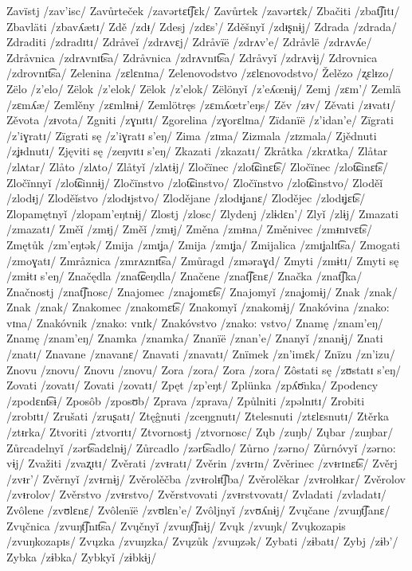 Zavïstj /zav’isc/
Zavůrteček /zavərtɛt͡ʃɛk/
Zavůrtek /zavərtɛk/
Zbačiti /zbat͡ʃɪtɪ/
Zbavläti /zbavʎætɪ/
Zdě /zdᵻ/
Zdesj /zdɛs’/
Zděšnyǐ /zdᵻʂnɨj/
Zdrada /zdrada/
Zdraditi /zdradɪtɪ/
Zdråveǐ /zdrʌvɛj/
Zdråvïë /zdrʌv’e/
Zdråvlë /zdrʌvʎe/
Zdråvnica /zdrʌvnɪt͡sa/
Zdråvnica /zdrʌvnɪt͡sa/
Zdråvyǐ /zdrʌvɨj/
Zdrovnica /zdrovnɪt͡sa/
Zelenina /zɛlɛnɪna/
Zelenovodstvo /zɛlɛnovodstvo/
Želězo /ʐɛlᵻzo/
Zëlo /z’elo/
Zëlok /z’elok/
Zëlok /z’elok/
Zëlönyǐ /z’eʎœnɨj/
Zemj /zɛm’/
Zemlä /zɛmʎæ/
Zemlěny /zɛmlᵻnɨ/
Zemlötręs /zɛmʎœtr’eŋs/
Zěv /zᵻv/
Zěvati /zᵻvatɪ/
Zěvota /zᵻvota/
Zgniti /zɣnɪtɪ/
Zgorelina /zɣorɛlɪna/
Zïdanïë /z’idan’e/
Zïgrati /z’iɣratɪ/
Zïgrati sę /z’iɣratɪ s’eŋ/
Zima /zɪma/
Zizmala /zɪzmala/
Zjědnuti /zʝᵻdnutɪ/
Zjęviti sę /zeŋvɪtɪ s’eŋ/
Zkazati /zkazatɪ/
Zkråtka /zkrʌtka/
Zlåtar /zlʌtar/
Zlåto /zlʌto/
Zlåtyǐ /zlʌtɨj/
Zločïnec /zlot͡ɕinɛt͡s/
Zločïnec /zlot͡ɕinɛt͡s/
Zločïnnyǐ /zlot͡ɕinnɨj/
Zločïnstvo /zlot͡ɕinstvo/
Zločïnstvo /zlot͡ɕinstvo/
Zloděǐ /zlodᵻj/
Zloděǐstvo /zlodᵻjstvo/
Zlodějane /zlodᵻʝanɛ/
Zlodějec /zlodᵻʝɛt͡s/
Zlopamętnyǐ /zlopam’eŋtnɨj/
Zlostj /zlosc/
Zlydenj /zlɨdɛn’/
Zlyǐ /zlɨj/
Zmazati /zmazatɪ/
Změǐ /zmᵻj/
Změǐ /zmᵻj/
Změna /zmᵻna/
Změnivec /zmᵻnɪvɛt͡s/
Zmętůk /zm’eŋtək/
Zmija /zmɪʝa/
Zmija /zmɪʝa/
Zmijalica /zmɪʝalɪt͡sa/
Zmogati /zmoɣatɪ/
Zmråznica /zmrʌznɪt͡sa/
Zmůragd /zməraɣd/
Zmyti /zmɨtɪ/
Zmyti sę /zmɨtɪ s’eŋ/
Značędla /znat͡ɕeŋdla/
Značene /znat͡ʃɛnɛ/
Značka /znat͡ʃka/
Značnostj /znat͡ʃnosc/
Znajomec /znaʝomɛt͡s/
Znajomyǐ /znaʝomɨj/
Znak /znak/
Znak /znak/
Znakomec /znakomɛt͡s/
Znakomyǐ /znakomɨj/
Znakóvina /znako: vɪna/
Znakóvnik /znako: vnɪk/
Znakóvstvo /znako: vstvo/
Znamę /znam’eŋ/
Znamę /znam’eŋ/
Znamka /znamka/
Znanïë /znan’e/
Znanyǐ /znanɨj/
Znati /znatɪ/
Znavane /znavanɛ/
Znavati /znavatɪ/
Znïmek /zn’imɛk/
Znïzu /zn’izu/
Znovu /znovu/
Znovu /znovu/
Zora /zora/
Zora /zora/
Zôstati sę /zʊstatɪ s’eŋ/
Zovati /zovatɪ/
Zovati /zovatɪ/
Zpęt /zp’eŋt/
Zplünka /zpʎʊ̈nka/
Zpodency /zpodɛnt͡sɨ/
Zposôb /zposʊb/
Zprava /zprava/
Způlniti /zpəlnɪtɪ/
Zrobiti /zrobɪtɪ/
Zrušati /zruʂatɪ/
Ztęĝnuti /zceŋgnutɪ/
Ztelesnuti /ztɛlɛsnutɪ/
Ztěrka /ztᵻrka/
Ztvoriti /ztvorɪtɪ/
Ztvornostj /ztvornosc/
Zųb /zuŋb/
Zųbar /zuŋbar/
Zůrcadelnyǐ /zərt͡sadɛlnɨj/
Zůrcadlo /zərt͡sadlo/
Zůrno /zərno/
Zůrnóvyǐ /zərno: vɨj/
Zvažiti /zvaʐɪtɪ/
Zvěrati /zvᵻratɪ/
Zvěrin /zvᵻrɪn/
Zvěrinec /zvᵻrɪnɛt͡s/
Zvěrj /zvᵻr’/
Zvěrnyǐ /zvᵻrnɨj/
Zvěrolěčba /zvᵻrolᵻt͡ʃba/
Zvěrolěkar /zvᵻrolᵻkar/
Zvěrolov /zvᵻrolov/
Zvěrstvo /zvᵻrstvo/
Zvěrstvovati /zvᵻrstvovatɪ/
Zvladati /zvladatɪ/
Zvôlene /zvʊlɛnɛ/
Zvôlenïë /zvʊlɛn’e/
Zvôljnyǐ /zvʊʎnɨj/
Zvųčane /zvuŋt͡ʃanɛ/
Zvųčnica /zvuŋt͡ʃnɪt͡sa/
Zvųčnyǐ /zvuŋt͡ʃnɨj/
Zvųk /zvuŋk/
Zvųkozapis /zvuŋkozapɪs/
Zvųzka /zvuŋzka/
Zvųzůk /zvuŋzək/
Zybati /zɨbatɪ/
Zybj /zɨb’/
Zybka /zɨbka/
Zybkyǐ /zɨbkɨj/